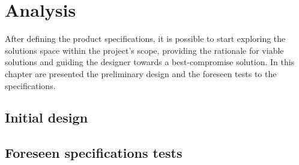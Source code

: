 \chapter{Analysis}%
\label{ch:analysis}
After defining the product specifications, it is possible to start exploring the
solutions space within the project's scope, providing the rationale for viable
solutions and guiding the designer towards a best-compromise solution. In this
chapter are presented the preliminary design and the foreseen tests to
the specifications. 
%
%
%
%
\section{Initial design}%
\label{sec:initial-design}

%
\section{Foreseen specifications tests}%
\label{sec:planning}

%

